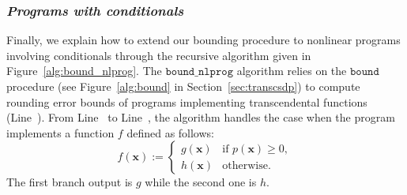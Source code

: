 \documentclass[preprint]{sigplanconf}
\newcommand{\x}{\mathbf{x}}
\newcommand{\bound}{\mathtt{bound}}
\newcommand{\boundnlprog}{\mathtt{bound\_nlprog}}
\theoremstyle{plain}
\begin{document}
\subsubsection*{\textit{Programs with conditionals}}
Finally, we explain how to extend our bounding procedure to nonlinear programs involving conditionals through the recursive algorithm given in Figure~\ref{alg:bound_nlprog}.
The $\boundnlprog$ algorithm relies on the $\bound$ procedure (see Figure~\ref{alg:bound} in Section~\ref{sec:transcsdp}) to compute rounding error bounds of programs implementing transcendental functions (Line~).
From Line~ to Line~, the algorithm handles the case when the program implements a function $f$ defined as follows:
\[   
f (\x) := 
     \begin{cases}
       g(\x) &\text{if } p(\x) \geq 0,\\
       h(\x) &\text{otherwise}.
     \end{cases}
\]
The first branch output is $g$ while the second one is $h$.
\end{document}
